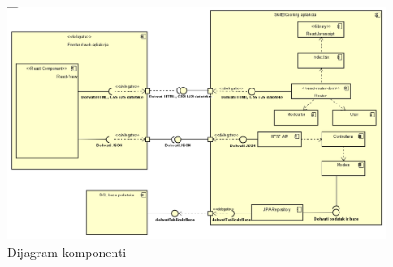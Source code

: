 \begin{figure}[H]
	\includegraphics[scale=0.6]{slike/dijagramKomp.png} %
	\centering
	\caption{Dijagram komponenti}
	\label{fig:promjene}
\end{figure}